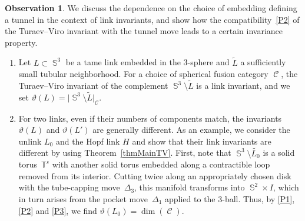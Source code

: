\documentclass[10pt,a4paper]{amsart}
\DeclareMathOperator{\Sp}{\mathbb{S}}
\DeclareMathOperator{\calc}{\mathcal{C}}
\numberwithin{equation}{section}
\theoremstyle{definition}
\newtheorem{Observation}[Observation]{Observation}
\begin{document}
\begin{Observation}\label{obs}
We discuss the dependence on the choice of embedding defining a tunnel in the context of link invariants, and show how the compatibility~\ref{P2} of the Turaev--Viro invariant with the tunnel move leads to a certain invariance property.
 \begin{enumerate}\itemsep=0pt
 \item Let $L \subset \Sp^3$ be a tame link embedded in the 3-sphere and $\widetilde{L}$ a sufficiently small tubular neighborhood. For a choice of spherical fusion category $\calc$, the Turaev--Viro invariant of the complement $\Sp^3 \setminus \widetilde{L}$ is a link invariant, and we set $\vartheta(L) = \bigl|\Sp^3 \setminus \widetilde{L}\bigr|_{\calc}$.
 \item For two links, even if their numbers of components match, the invariants $\vartheta(L)$ and $\vartheta(L')$ are generally different. As an example, we consider the unlink $L_0$ and the Hopf link $H$ and show that their link invariants are different by using Theorem~\ref{thmMainTV}. First, note that $\Sp^3 \setminus \widetilde{L_0}$ is a solid torus~$\mathbb{T}^s$ with another solid torus embedded along a contractible loop removed from its interior. Cutting twice along an appropriately chosen disk with the tube-capping move~$\Delta_3$, this manifold transforms into $\Sp^2 \times I$, which in turn arises from the pocket move~$\Delta_1$ applied to the 3-ball. Thus, by \ref{P1}, \ref{P2} and \ref{P3}, we find $\vartheta(L_0) = \dim(\calc)$.


\end{enumerate}
\end{Observation}
\end{document}
